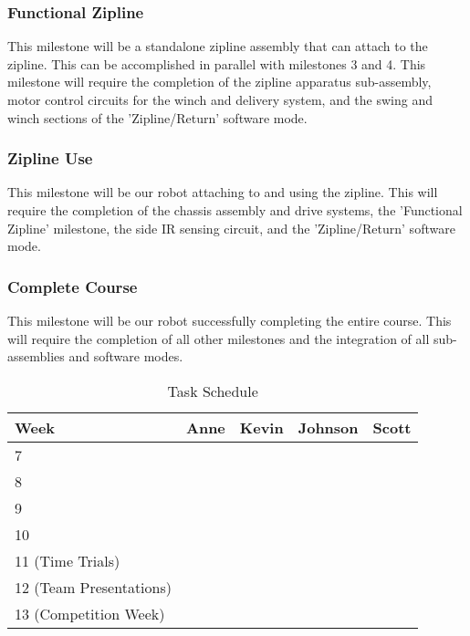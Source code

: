 \documentclass[11pt, oneside]{article} %
\begin{document}
		\subsubsection{Functional Zipline}
		This milestone will be a standalone zipline assembly that can attach to the zipline. This can be accomplished in parallel with milestones 3 and 4. This milestone will require the completion of the zipline apparatus sub-assembly, motor control circuits for the winch and delivery system, and the swing and winch sections of the 'Zipline/Return' software mode.
		\subsubsection{Zipline Use}
		This milestone will be our robot attaching to and using the zipline. This will require the completion of the chassis assembly and drive systems, the 'Functional Zipline' milestone, the side IR sensing circuit, and the 'Zipline/Return' software mode.
		\subsubsection{Complete Course}
		This milestone will be our robot successfully completing the entire course. This will require the completion of all other milestones and the integration of all sub-assemblies and software modes.
		
\begin{table}[ht]
	\caption{Task Schedule}
	\centering
	\begin{tabular}{ | p{4.5cm} | p{3cm} | p{3cm} | p{3cm} | p{3cm} |} 
	\hline
	\textbf{Week} & \textbf{Anne} & \textbf{Kevin} & \textbf{Johnson} & \textbf{Scott} \\ \hline 
	7& & & & \\ \hline
	8& & & & \\ \hline
	9& & & & \\ \hline
	10& & & & \\ \hline
	11 (Time Trials)& & & & \\ \hline
	12 (Team Presentations)& & & & \\ \hline
	13 (Competition Week)& & & & \\ \hline
	\end{tabular}
	\label{table:Task Schedule}
\end{table}

\clearpage

\end{document}
